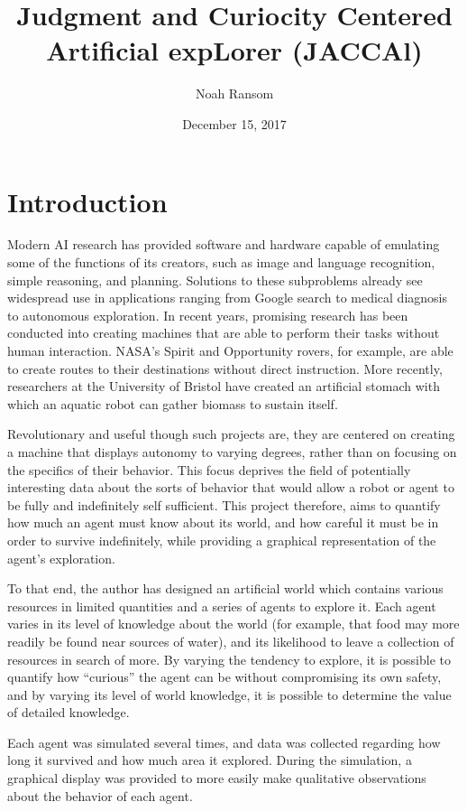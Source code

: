\documentclass[12pt]{article}
\title{Judgment and Curiocity Centered Artificial expLorer (JACCAl)}
\author{Noah Ransom}
\date{December 15, 2017}
\begin{document}
\maketitle
\pagebreak
\section{Introduction}
Modern AI research has provided software and hardware capable of emulating some of the functions of its creators, such as image and language recognition, simple reasoning, and planning. Solutions to these subproblems already see widespread use in applications ranging from Google search to medical diagnosis to autonomous exploration. In recent years, promising research has been conducted into creating machines that are able to perform their tasks without human interaction. NASA’s Spirit and Opportunity rovers, for example, are able to create routes to their destinations without direct instruction. More recently, researchers at the University of Bristol have created an artificial stomach with which an aquatic robot can gather biomass to sustain itself. 

Revolutionary and useful though such projects are, they are centered on creating a machine that displays autonomy to varying degrees, rather than on focusing on the specifics of their behavior. This focus deprives the field of potentially interesting data about the sorts of behavior that would allow a robot or agent to be fully and indefinitely self sufficient. This project therefore, aims to quantify how much an agent must know about its world, and how careful it must be in order to survive indefinitely, while providing a graphical representation of the agent’s exploration.

To that end, the author has designed an artificial world which contains various resources in limited quantities and a series of agents to explore it. Each agent varies in its level of knowledge about the world (for example, that food may more readily be found near sources of water), and its likelihood to leave a collection of resources in search of more. By varying the tendency to explore, it is possible to quantify how “curious” the agent can be without compromising its own safety, and by varying its level of world knowledge, it is possible to determine the value of detailed knowledge.

Each agent was simulated several times, and data was collected regarding how long it survived and how much area it explored. During the simulation, a graphical display was provided to more easily make qualitative observations about the behavior of each agent.
\end{document}
